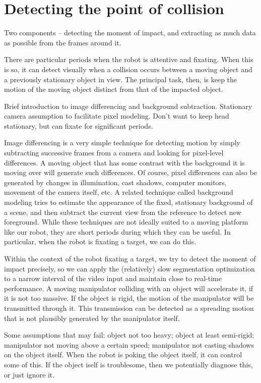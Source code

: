 
\section{Detecting the point of collision}

Two components -- detecting the moment of impact, and extracting as 
much data as possible from the frames around it.

There are particular periods when the robot is attentive and fixating.
When this is so, it can detect visually when a collision occurs
between a moving object and a previously stationary object in view.
The principal task, then, is keep the motion of the moving object distinct
from that of the impacted object.

Brief introduction to image differencing and background subtraction.
Stationary camera assumption to facilitate pixel modeling.  Don't want
to keep head stationary, but can fixate for significant periods.

Image differencing is a very simple technique for detecting motion by
simply subtracting successive frames from a camera and looking for
pixel-level differences.  A moving object that has some contrast with
the background it is moving over will generate such differences.  Of
course, pixel differences can also be generated by changes in
illumination, cast shadows, computer monitors, movement of the camera
itself, etc.  A related technique called background modeling tries to
estimate the appearance of the fixed, stationary background of a 
scene, and then subtract the current view from the reference to 
detect new foreground.  While these techniques are not ideally
suited to a moving platform like our robot, they are short periods 
during which they can be useful.  In particular, when the robot is
fixating a target, we can do this.

Within the context of the robot fixating a target, we try to detect
the moment of impact precisely, so we can apply the (relatively) slow
segmentation optimization to a narrow interval of the video input and
maintain close to real-time performance.  A moving manipulator
colliding with an object will accelerate it, if it is not too massive.
If the object is rigid, the motion of the manipulator will be transmitted 
through it.  This transmission can be detected as a spreading motion
that is not plausibly generated by the manipulator itself.

Some assumptions that may fail: object not too heavy; object at least
semi-rigid; manipulator not moving above a certain speed; manipulator
not casting shadows on the object itself.  When the robot is poking the
object itself, it can control some of this.  If the object iself is
troublesome, then we potentially diagnose this, or just ignore it.

